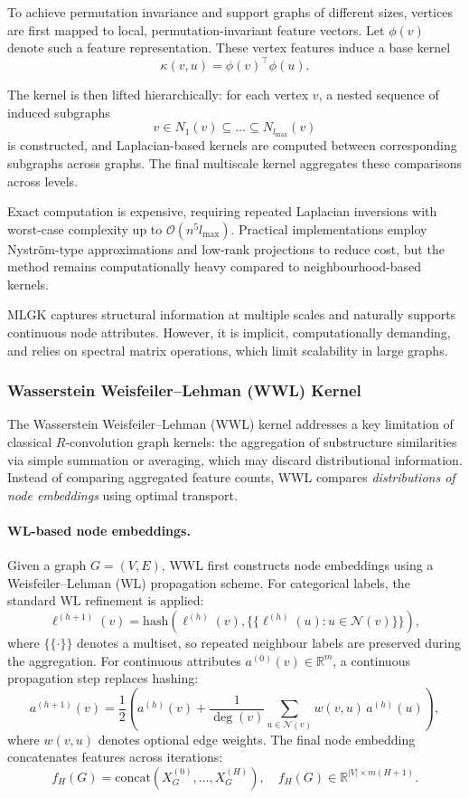 To achieve permutation invariance and
support graphs of different sizes,
vertices are first mapped to
local, permutation-invariant feature vectors.
Let $\phi(v)$ denote such a feature representation.
These vertex features induce a base kernel
\[
\kappa(v,u) = \phi(v)^\top \phi(u).
\]

The kernel is then lifted hierarchically:
for each vertex $v$, a nested sequence
of induced subgraphs
\[
v \in N_1(v) \subseteq \dots \subseteq N_{l_{\max}}(v)
\]
is constructed,
and Laplacian-based kernels are computed
between corresponding subgraphs across graphs.
The final multiscale kernel aggregates
these comparisons across levels.

Exact computation is expensive,
requiring repeated Laplacian inversions
with worst-case complexity up to
$\mathcal{O}(n^5 l_{\max})$.
Practical implementations employ
Nyström-type approximations and
low-rank projections to reduce cost,
but the method remains computationally heavy
compared to neighbourhood-based kernels.

MLGK captures structural information
at multiple scales and naturally supports
continuous node attributes.
However, it is implicit, computationally demanding,
and relies on spectral matrix operations,
which limit scalability in large graphs.


\subsubsection{Wasserstein Weisfeiler--Lehman (WWL) Kernel}
\label{sec:related:wwl}

The Wasserstein Weisfeiler--Lehman (WWL) kernel \citep{togninalli2019wasserstein}
addresses a key limitation of classical $R$-convolution graph kernels:
the aggregation of substructure similarities via simple summation or averaging,
which may discard distributional information.
Instead of comparing aggregated feature counts, WWL compares
\emph{distributions of node embeddings} using optimal transport.

\paragraph{WL-based node embeddings.}
Given a graph $G=(V,E)$, WWL first constructs node embeddings
using a Weisfeiler--Lehman (WL) propagation scheme.
For categorical labels, the standard WL refinement is applied:
\[
\ell^{(h+1)}(v)
=
\mathrm{hash}\!\left(
\ell^{(h)}(v),
\{\!\!\{\ell^{(h)}(u) : u \in \mathcal{N}(v)\}\!\!\}
\right),
\]
where $\{\!\!\{\cdot\}\!\!\}$ denotes a multiset, so repeated neighbour labels are
preserved during the aggregation.
For continuous attributes $a^{(0)}(v) \in \mathbb{R}^m$,
a continuous propagation step replaces hashing:
\[
a^{(h+1)}(v)
=
\frac{1}{2}
\left(
a^{(h)}(v)
+
\frac{1}{\deg(v)}
\sum_{u \in \mathcal{N}(v)}
w(v,u)\, a^{(h)}(u)
\right),
\]
where $w(v,u)$ denotes optional edge weights.
The final node embedding concatenates features across
iterations:
\[
f_H(G)
=
\mathrm{concat}\!\left(X_G^{(0)}, \dots, X_G^{(H)}\right),
\quad
f_H(G) \in \mathbb{R}^{|V| \times m(H+1)}.
\]


